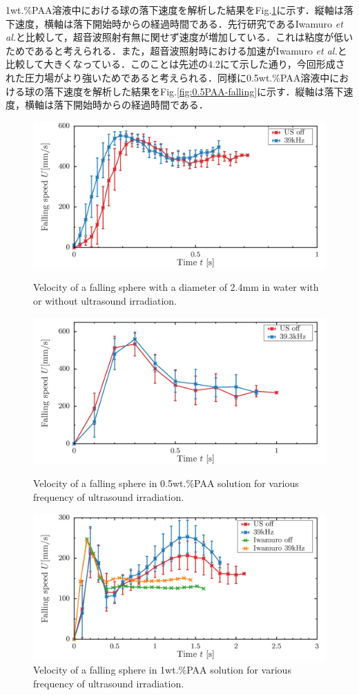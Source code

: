 1wt.\%PAA溶液中における球の落下速度を解析した結果をFig.\ref{fig:1PAA-falling}に示す．縦軸は落下速度，横軸は落下開始時からの経過時間である．先行研究であるIwamuro {\it et al.}\cite{ref:9}と比較して，超音波照射有無に関せず速度が増加している．これは粘度が低いためであると考えられる．また，超音波照射時における加速がIwamuro {\it et al.}\cite{ref:9}と比較して大きくなっている．このことは先述の4.2にて示した通り，今回形成された圧力場がより強いためであると考えられる．同様に0.5wt.\%PAA溶液中における球の落下速度を解析した結果をFig.\ref{fig:0.5PAA-falling}に示す．縦軸は落下速度，横軸は落下開始時からの経過時間である．
\newpage
\begin{figure}[ht]
    \centering
    \includegraphics[width=12cm,clip]{./4-Results/f-water.png}
    \caption{Velocity of a falling sphere with a diameter of 2.4mm in water with or without ultrasound irradiation.}
    \label{fig:water}
    \centering
    \includegraphics[width=12cm,clip]{./4-Results/s0.5.png}
    \caption{Velocity of a falling sphere in 0.5wt.\%PAA solution for various frequency of
        ultrasound irradiation.}
    \label{fig:0.5PAA-falling}
    \centering
    \includegraphics[width=12cm,clip]{./4-Results/s1.png}
    \caption{Velocity of a falling sphere in 1wt.\%PAA solution for various frequency of
        ultrasound irradiation.}
    \label{fig:1PAA-falling}
\end{figure}

